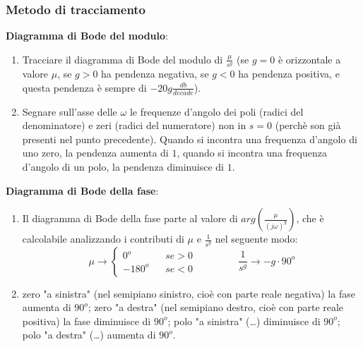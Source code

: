 \subsubsection{Metodo di tracciamento}
\textbf{Diagramma di Bode del modulo}: 
\begin{enumerate}
    \item Tracciare il diagramma di Bode del modulo di $\frac{\mu}{s^g}$ (se $g=0$ è orizzontale a valore $\mu$, se $g >0$ ha pendenza negativa, se $g<0$ ha pendenza positiva, e questa pendenza è sempre di $-20 g \frac{db}{decade}$).
    \item Segnare sull'asse delle $\omega$ le frequenze d'angolo dei poli (radici del denominatore) e zeri (radici del numeratore) non in $s=0$ (perchè son già presenti nel punto precedente).\newline
    Quando si incontra una frequenza d'angolo di uno zero, la pendenza aumenta di $1$, quando si incontra una frequenza d'angolo di un polo, la pendenza diminuisce di $1$.
\end{enumerate}
\textbf{Diagramma di Bode della fase}:
\begin{enumerate}
    \item Il diagramma di Bode della fase parte al valore di $arg(\frac{\mu}{(j \omega)^g})$, che è calcolabile analizzando i contributi di $\mu$ e $\frac{1}{s^g}$ nel seguente modo:
    \[
        \mu \rightarrow \begin{cases}
            0^o \;\;\;& se > 0\\
            -180^o \;\;\; & se <0
        \end{cases} \;\;\;\;\;\;\;\;\;\;\;\;\;\;\; \frac{1}{s^g}\rightarrow -g \cdot 90^o
    \]
    \item zero "a sinistra" (nel semipiano sinistro, cioè con parte reale negativa) la fase aumenta di $90^o$;\newline
    zero "a destra" (nel semipiano destro, cioè con parte reale positiva) la fase diminuisce di $90^o$;\newline
    polo "a sinistra" (\dots) diminuisce di $90^o$;\newline
    polo "a destra" (\dots) aumenta di $90^o$.
\end{enumerate}
